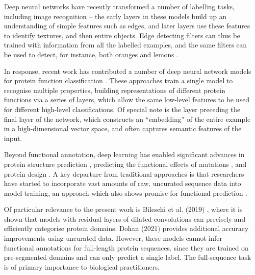 Deep neural networks have recently transformed a number of labelling tasks, including image recognition -- the early layers in these models build up an understanding of simple features such as edges, and later layers use these features to identify textures, and then entire objects. Edge detecting filters can thus be trained with information from all the labelled examples, and the same filters can be used to detect, for instance, both oranges and lemons \cite{activationatlas}.

In response, recent work has contributed a number of deep neural network models for protein function classification \citep{ecpred,deepgo,prolango,deeploc,dspace,deepred,deepre,deepsf,littmann2021embeddings}. These approaches train a single model to recognise multiple properties, building representations of different protein functions via a series of layers, which allow the same low-level features to be used for different high-level classifications. Of special note is the layer preceding the final layer of the network, which constructs an ``embedding'' of the entire example in a high-dimensional vector space, and often captures semantic features of the input. 

Beyond functional annotation, deep learning has enabled significant advances in protein structure prediction \cite{alquraishi2019end, senior2020improved, Yang1496, yang2020improved, du2020energy, rao2021msa}, predicting the functional effects of mutations \cite{riesselman2018deep,rives2019biological,rao2019evaluating,frazer2020large}, and protein design \cite{yang2019machine, mazurenko2019machine, biswas2020low, madani2020progen,elnaggar2020prottrans, anishchenko2020novo, bryant2021deep}. A key departure from traditional approaches is that researchers have started to incorporate vast amounts of raw, uncurated sequence data into model training, an approach which also shows promise for functional prediction \citep{Brandes2021}. 

Of particular relevance to the present work is Bileschi et al. (2019) \citep{bileschi}, where it is shown that models with residual layers \citep{resnet} of dilated convolutions \citep{dilatedconvolutions} can precisely and efficiently categorise protein domains.  Dohan (2021) \cite{dohan2021kdd} provides additional accuracy improvements using uncurated data. However, these models cannot infer functional annotations for full-length protein sequences, since they are trained on pre-segmented domains and can only predict a single label. The full-sequence task is of primary importance to biological practitioners.

